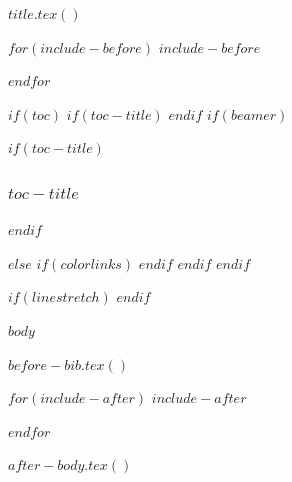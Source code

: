 
$title.tex()$



  \frontmatter


  $for(include-before)$
    $include-before$

  $endfor$
  
  $if(toc)$
    $if(toc-title)$
      \renewcommand*\contentsname{$toc-title$}
    $endif$
    $if(beamer)$
      \begin{frame}[allowframebreaks]
      $if(toc-title)$
        \frametitle{$toc-title$}
      $endif$
      \tableofcontents[hideallsubsections]
      \end{frame}
    $else$
      {
      $if(colorlinks)$
        \hypersetup{linkcolor=$if(toccolor)$$toccolor$$else$$endif$}
      $endif$
      \setcounter{tocdepth}{$toc-depth$}
      }
    $endif$
  $endif$
  
  $if(linestretch)$
  $endif$
  
  $body$
  
  $before-bib.tex()$
  
  \backmatter

  
  $for(include-after)$
    $include-after$
    
  $endfor$

  $after-body.tex()$
  

